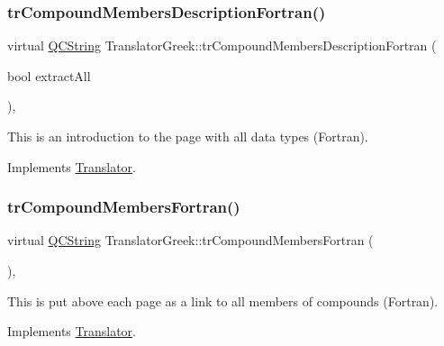 \subsubsection{\texorpdfstring{trCompoundMembersDescriptionFortran()}{trCompoundMembersDescriptionFortran()}}
{\footnotesize\ttfamily virtual \mbox{\hyperlink{class_q_c_string}{Q\+C\+String}} Translator\+Greek\+::tr\+Compound\+Members\+Description\+Fortran (\begin{DoxyParamCaption}\item[{bool}]{extract\+All }\end{DoxyParamCaption})\hspace{0.3cm}{\ttfamily [inline]}, {\ttfamily [virtual]}}

This is an introduction to the page with all data types (Fortran). 

Implements \mbox{\hyperlink{class_translator}{Translator}}.

\mbox{\label{class_translator_greek_afa4cafc980d744e0a9500def6edb6ba6}} 
\subsubsection{\texorpdfstring{trCompoundMembersFortran()}{trCompoundMembersFortran()}}
{\footnotesize\ttfamily virtual \mbox{\hyperlink{class_q_c_string}{Q\+C\+String}} Translator\+Greek\+::tr\+Compound\+Members\+Fortran (\begin{DoxyParamCaption}{ }\end{DoxyParamCaption})\hspace{0.3cm}{\ttfamily [inline]}, {\ttfamily [virtual]}}

This is put above each page as a link to all members of compounds (Fortran). 

Implements \mbox{\hyperlink{class_translator}{Translator}}.

\mbox{\label{class_translator_greek_a170612fad7df5d18938666d06aff485c}} 
